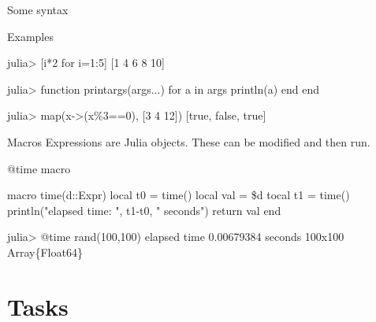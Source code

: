 \documentclass{beamer}
\begin{document}
	\begin{frame}[fragile]{Some syntax}
		\begin{block}{Examples}
			\begin{semiverbatim}
			julia> [i*2 for i=1:5]   
			[1 4 6 8 10]
			
			julia> function printargs(args...)
			         for a in args
		 	           println(a)
			         end
			       end

			julia> map(x->(x\%3==0), [3 4 12])
			[true, false, true]        
			\end{semiverbatim}
		\end{block}
	\end{frame}

	\begin{frame}[fragile]{Macros}
		Expressions are Julia objects. These can be modified and then run.
		\begin{block}{@time macro}
			\begin{semiverbatim}
			macro time(d::Expr) 
			  local t0 = time()
			  local val = \$d
			  tocal t1 = time()
			  println("elapsed time: ", t1-t0, " seconds")
			  return val
			end

			julia> @time rand(100,100)
			elapsed time 0.00679384 seconds
			100x100 Array\{Float64\}
			\end{semiverbatim}
		\end{block}
	\end{frame}

	\section{Tasks}
\end{document}
